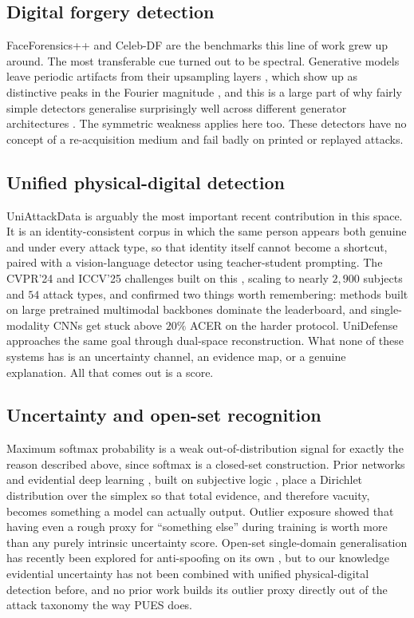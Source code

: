 \documentclass[conference]{IEEEtran}
\begin{document}
\subsection{Digital forgery detection}
FaceForensics++ \cite{rossler2019ff} and Celeb-DF \cite{li2020celebdf} are the
benchmarks this line of work grew up around. The most transferable cue turned out
to be spectral. Generative models leave periodic artifacts from their upsampling
layers \cite{odena2016checkerboard}, which show up as distinctive peaks in the
Fourier magnitude \cite{frank2020frequency}, and this is a large part of why fairly
simple detectors generalise surprisingly well across different generator
architectures \cite{wang2020cnnspot}. The symmetric weakness applies here too. These
detectors have no concept of a re-acquisition medium and fail badly on printed or
replayed attacks.

\subsection{Unified physical-digital detection}
UniAttackData \cite{yu2024unified} is arguably the most important recent
contribution in this space. It is an identity-consistent corpus in which the same
person appears both genuine and under every attack type, so that identity itself
cannot become a shortcut, paired with a vision-language detector using
teacher-student prompting. The CVPR'24 and ICCV'25 challenges built on this
\cite{yuan2024challenge,ma2025uniattackplus}, scaling to nearly $2{,}900$ subjects
and $54$ attack types, and confirmed two things worth remembering: methods built on
large pretrained multimodal backbones dominate the leaderboard, and
single-modality CNNs get stuck above $20\%$ ACER on the harder protocol. UniDefense
\cite{zhang2024unidefense} approaches the same goal through dual-space
reconstruction. What none of these systems has is an uncertainty channel, an
evidence map, or a genuine explanation. All that comes out is a score.

\subsection{Uncertainty and open-set recognition}
Maximum softmax probability \cite{hendrycks2017msp} is a weak out-of-distribution
signal for exactly the reason described above, since softmax is a closed-set
construction. Prior networks \cite{malinin2018prior} and evidential deep learning
\cite{sensoy2018edl}, built on subjective logic \cite{josang2016subjective}, place a
Dirichlet distribution over the simplex so that total evidence, and therefore
vacuity, becomes something a model can actually output. Outlier exposure
\cite{hendrycks2019oe} showed that having even a rough proxy for ``something else''
during training is worth more than any purely intrinsic uncertainty score. Open-set
single-domain generalisation has recently been explored for anti-spoofing on its own
\cite{liu2024openset}, but to our knowledge evidential uncertainty has not been
combined with unified physical-digital detection before, and no prior work builds
its outlier proxy directly out of the attack taxonomy the way PUES does.
\end{document}
